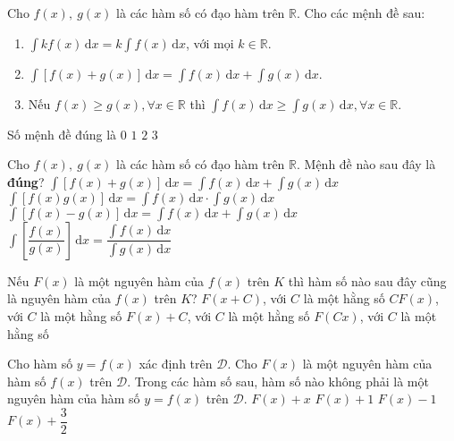 \begin{ex}%
	Cho $f(x),\ g(x)$ là các hàm số có đạo hàm trên $\mathbb{R}$. Cho các mệnh đề sau:
	\begin{enumerate}[(1)]
		\item $\displaystyle \int kf(x)\mathrm{\,d}x=k\int f(x)\mathrm{\,d}x$, với mọi $k\in\mathbb{R}$.
		\item $\displaystyle \int \left[f(x)+g(x)\right]\mathrm{\,d}x=\int f(x)\mathrm{\,d}x+\int g(x)\mathrm{\,d}x$.
		\item Nếu $f(x)\ge g(x),\forall x\in\mathbb{R}$ thì $\displaystyle \int f(x)\mathrm{\,d}x\ge \int g(x)\mathrm{\,d}x,\forall x\in\mathbb{R}$.
	\end{enumerate}
	Số mệnh đề đúng là
	\choice
	{$0$}
	{\True $1$}
	{$2$}
	{$3$}
\end{ex}
\begin{ex}%
	Cho $f(x),\ g(x)$ là các hàm số có đạo hàm trên $\mathbb{R}$. Mệnh đề nào sau đây là \textbf{đúng}?
	\choice
	{\True $\displaystyle \int \left[f(x)+g(x)\right]\mathrm{\,d}x=\int f(x)\mathrm{\,d}x+\int g(x)\mathrm{\,d}x$}
	{$\displaystyle \int \left[f(x)g(x)\right]\mathrm{\,d}x=\int f(x)\mathrm{\,d}x\cdot\int g(x)\mathrm{\,d}x$}
	{$\displaystyle \int \left[f(x)-g(x)\right]\mathrm{\,d}x=\int f(x)\mathrm{\,d}x+\int g(x)\mathrm{\,d}x$}
	{$\displaystyle \int \left[\dfrac{f(x)}{g(x)}\right]\mathrm{\,d}x=\dfrac{\displaystyle \int f(x)\mathrm{\,d}x}{\displaystyle\int g(x)\mathrm{\,d}x}$}
\end{ex}
\begin{ex}%
	Nếu $F(x)$ là một nguyên hàm của $f(x)$ trên $K$ thì hàm số nào sau đây cũng là nguyên hàm của $f(x)$ trên $K$?
	\choice
	{$F(x+C)$, với $C$ là một hằng số}
	{$CF(x)$, với $C$ là một hằng số}
	{\True $F(x)+C$, với $C$ là một hằng số}
	{$F(Cx)$, với $C$ là một hằng số}
\end{ex}

\begin{ex}%
	Cho hàm số $y=f(x)$ xác định trên $\mathscr{D}$. Cho $F(x)$ là một nguyên hàm của hàm số $f(x)$ trên $\mathscr{D}$. Trong các hàm số sau, hàm số nào không phải là một nguyên hàm của hàm số $y=f(x)$ trên $\mathscr{D}$.
	\choice
	{\True $F(x)+x$}
	{$F(x)+1$}
	{$F(x)-1$}
	{$F(x)+\dfrac{3}{2}$}
\end{ex}

